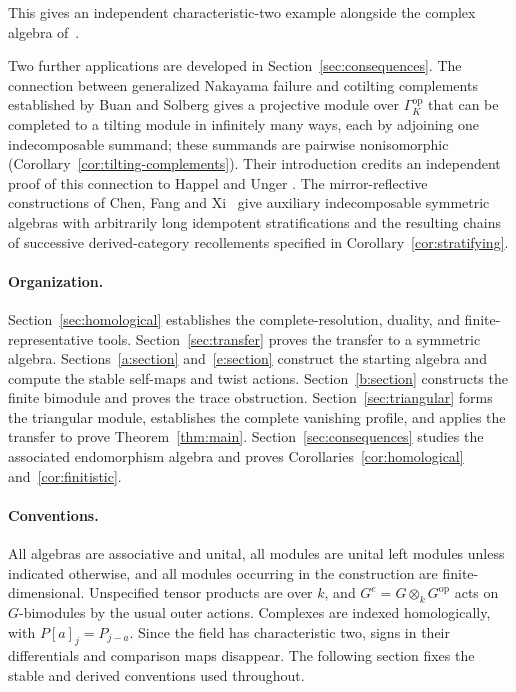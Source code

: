 This gives an independent characteristic-two example alongside the
complex algebra of~\cite[Theorem~1.1]{OpenAIFinitistic2026}.

Two further applications are developed in
Section~\ref{sec:consequences}. The connection between generalized
Nakayama failure and cotilting complements established by Buan and Solberg
\cite[Theorems~3.1 and~3.4]{BuanSolberg1998} gives a projective module
over $\Gamma_K^{\mathrm{op}}$ that can be completed to a tilting module
in infinitely many ways, each by adjoining one indecomposable summand;
these summands are pairwise nonisomorphic
(Corollary~\ref{cor:tilting-complements}). Their introduction credits
an independent proof of this connection to Happel and Unger
\cite[Introduction]{BuanSolberg1998}. The mirror-reflective
constructions of Chen, Fang and Xi~\cite{ChenFangXi2024} give auxiliary
indecomposable symmetric algebras with arbitrarily long idempotent
stratifications and the resulting chains of successive derived-category
recollements specified in Corollary~\ref{cor:stratifying}.

\paragraph{Organization.}
Section~\ref{sec:homological} establishes the complete-resolution,
duality, and finite-representative tools.
Section~\ref{sec:transfer} proves the transfer to a symmetric algebra.
Sections~\ref{a:section} and~\ref{e:section} construct the starting
algebra and compute the stable self-maps and twist actions.
Section~\ref{b:section} constructs the finite bimodule and proves the
trace obstruction. Section~\ref{sec:triangular} forms the triangular
module, establishes the complete vanishing profile, and applies the
transfer to prove Theorem~\ref{thm:main}.
Section~\ref{sec:consequences} studies the associated endomorphism
algebra and proves Corollaries~\ref{cor:homological} and~\ref{cor:finitistic}.

\paragraph{Conventions.}
All algebras are associative and unital, all modules are unital left
modules unless indicated otherwise, and all modules occurring in the
construction are finite-dimensional.
Unspecified tensor products are over $k$, and
$G^e=G\otimes_k G^{\mathrm{op}}$ acts on $G$-bimodules by the usual
outer actions.  Complexes are indexed homologically, with
$P[a]_j=P_{j-a}$.  Since the field has characteristic two, signs in
their differentials and comparison maps disappear.  The following
section fixes the stable and derived conventions used throughout.
